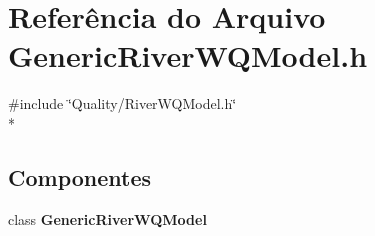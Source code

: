 \section{Referência do Arquivo Generic\+River\+W\+Q\+Model.\+h}
\label{_generic_river_w_q_model_8h}
{\ttfamily \#include \char`\"{}Quality/\+River\+W\+Q\+Model.\+h\char`\"{}}\\*
\subsection*{Componentes}
\begin{DoxyCompactItemize}
\item 
class {\bf Generic\+River\+W\+Q\+Model}
\end{DoxyCompactItemize}
